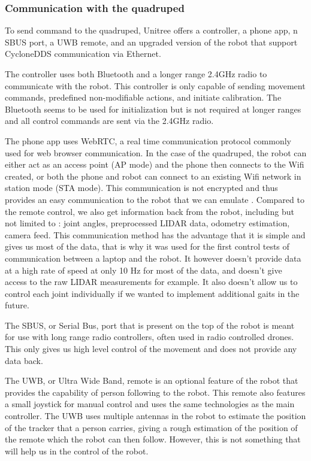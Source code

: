 \documentclass[12pt]{article}
\begin{document}
        
        \subsubsection{Communication with the quadruped}

        To send command to the quadruped, Unitree offers a controller, a phone app, n SBUS port, a UWB remote, and an upgraded version of the robot that support CycloneDDS communication via Ethernet.

        The controller uses both Bluetooth and a longer range 2.4GHz radio to communicate with the robot. This controller is only capable of sending movement commands, predefined non-modifiable actions, and initiate calibration. The Bluetooth seems to be used for initialization but is not required at longer ranges and all control commands are sent via the 2.4GHz radio.

        The phone app uses WebRTC, a real time communication protocol commonly used for web browser communication. In the case of the quadruped, the robot can either act as an access point (AP mode) and the phone then connects to the Wifi created, or both the phone and robot can connect to an existing Wifi network in station mode (STA mode). This communication is not encrypted and thus provides an easy communication to the robot that we can emulate \cite{go2_webrtc}. Compared to the remote control, we also get information back from the robot, including but not limited to : joint angles, preprocessed LIDAR data, odometry estimation, camera feed. This communication method has the advantage that it is simple and gives us most of the data, that is why it was used for the first control tests of communication between a laptop and the robot. It however doesn't provide data at a high rate of speed at only 10 Hz for most of the data, and doesn't give access to the raw LIDAR measurements for example. It also doesn't allow us to control each joint individually if we wanted to implement additional gaits in the future.

        The SBUS, or Serial Bus, port that is present on the top of the robot is meant for use with long range radio controllers, often used in radio controlled drones. This only gives us high level control of the movement and does not provide any data back.

        The UWB, or Ultra Wide Band, remote is an optional feature of the robot that provides the capability of person following to the robot. This remote also features a small joystick for manual control and uses the same technologies as the main controller. The UWB uses multiple antennas in the robot to estimate the position of the tracker that a person carries, giving a rough estimation of the position of the remote which the robot can then follow. However, this is not something that will help us in the control of the robot.
\end{document}

